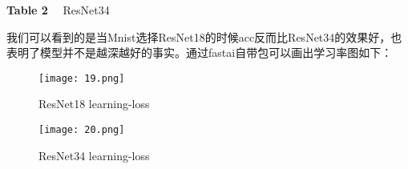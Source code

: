 \begin{center}
	\textbf{Table 2}~~ ResNet34\\
\end{center}
我们可以看到的是当Mnist选择ResNet18的时候acc反而比ResNet34的效果好，也表明了模型并不是越深越好的事实。通过fastai自带包可以画出学习率图如下：
\begin{figure}[htbp]
	\centering
	\begin{minipage}[t]{0.48\textwidth}
		\centering
		\texttt{[image: 19.png]}
		\caption{ResNet18 learning-loss}
	\end{minipage}
	\begin{minipage}[t]{0.48\textwidth}
		\centering
		\texttt{[image: 20.png]}
		\caption{ResNet34 learning-loss}
	\end{minipage}
\end{figure}
 